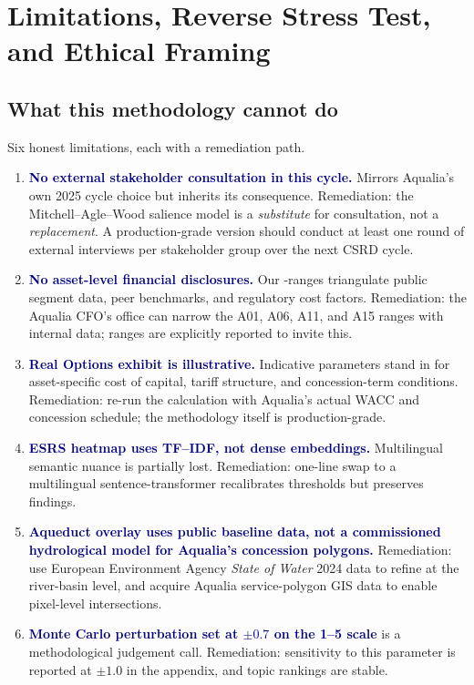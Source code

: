 \documentclass[11pt, a4paper, twoside, openright]{scrreprt}
\newcommand{\euro}{\texteuro}
\newcommand{\signalword}[1]{\textbf{\textcolor{navy}{#1}}}
\begin{document}
\chapter{Limitations, Reverse Stress Test, and Ethical Framing}
\label{chap:limits}

\section{What this methodology cannot do}

Six honest limitations, each with a remediation path.

\begin{enumerate}
\item \signalword{No external stakeholder consultation in this cycle.} Mirrors Aqualia's own 2025 cycle choice but inherits its consequence. Remediation: the Mitchell--Agle--Wood salience model is a \emph{substitute} for consultation, not a \emph{replacement}. A production-grade version should conduct at least one round of external interviews per stakeholder group over the next CSRD cycle.

\item \signalword{No asset-level financial disclosures.} Our \euro{}-ranges triangulate public segment data, peer benchmarks, and regulatory cost factors. Remediation: the Aqualia CFO's office can narrow the A01, A06, A11, and A15 ranges with internal data; ranges are explicitly reported to invite this.

\item \signalword{Real Options exhibit is illustrative.} Indicative parameters stand in for asset-specific cost of capital, tariff structure, and concession-term conditions. Remediation: re-run the calculation with Aqualia's actual WACC and concession schedule; the methodology itself is production-grade.

\item \signalword{ESRS heatmap uses TF--IDF, not dense embeddings.} Multilingual semantic nuance is partially lost. Remediation: one-line swap to a multilingual sentence-transformer recalibrates thresholds but preserves findings.

\item \signalword{Aqueduct overlay uses public baseline data, not a commissioned hydrological model for Aqualia's concession polygons.} Remediation: use European Environment Agency \emph{State of Water} 2024 data to refine at the river-basin level, and acquire Aqualia service-polygon GIS data to enable pixel-level intersections.

\item \signalword{Monte Carlo perturbation set at $\pm 0.7$ on the 1--5 scale} is a methodological judgement call. Remediation: sensitivity to this parameter is reported at $\pm 1.0$ in the appendix, and topic rankings are stable.
\end{enumerate}
\end{document}
